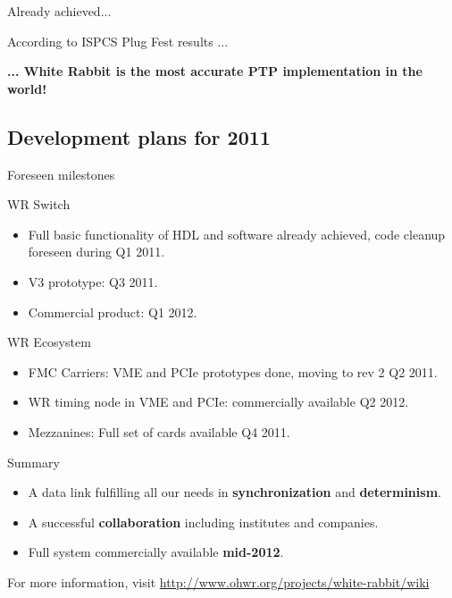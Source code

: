 \documentclass[compress,red]{beamer}
\begin{document}
\begin{frame}{Already achieved...}
  \begin{block}{According to ISPCS Plug Fest results ...}
    \begin{center}
      \textbf{... White Rabbit is the most accurate PTP implementation in the world!}
  \end{center}
  \end{block}
\end{frame}

\subsection{Development plans for 2011}


\begin{frame}{Foreseen milestones}

  \begin{block}{WR Switch}
    \begin{itemize} 
      \item Full basic functionality of HDL and software already achieved, code cleanup foreseen during Q1 2011.
      \item V3 prototype: Q3 2011.
      \item Commercial product: Q1 2012.
      \end{itemize}
    \end{block}

  \begin{block}{WR Ecosystem}
    \begin{itemize} 
      \item FMC Carriers: VME and PCIe prototypes done, moving to rev 2 Q2 2011.
      \item WR timing node in VME and PCIe: commercially available Q2 2012.
      \item Mezzanines: Full set of cards available Q4 2011. 
      \end{itemize}
    \end{block}

\end{frame}


\begin{frame}{Summary}
  \begin{itemize}
  \item
    A data link fulfilling all our needs in \textbf{synchronization} and \textbf{determinism}.
  \item
    A successful \textbf{collaboration} including institutes and companies.
  \item
    Full system commercially available \textbf{mid-2012}.
  \end{itemize}
  \vspace{10mm}
  \begin{center}
  For more information, visit \href{http://www.ohwr.org/projects/white-rabbit/wiki}{http://www.ohwr.org/projects/white-rabbit/wiki}    
  \end{center}
\end{frame}
\end{document}
